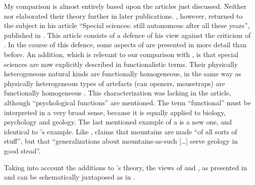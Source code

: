 \documentclass[output=paper]{langscibook}
\begin{document}
My comparison is almost entirely based upon the articles just discussed. Neither {\Sapir} nor {\Fodor} elaborated their theory further in later publications. {\Fodor}, however, returned to the subject in his article ``Special sciences: still autonomous after all these years'', published in \citeyear{Fodor1997}. This article consists of a defence of his view against the criticism of \citet{Kim1992}. In the course of this defence, some aspects of  are presented in more detail than before. An addition, which is relevant to our comparison with {\Sapir}, is that special sciences are now explicitly described in functionalistic terms. Their physically heterogeneous natural kinds are functionally homogeneous, in the same way as physically heterogeneous types of artefacts (can openers, mousetraps) are functionally homogeneous \citep[160]{Fodor1997}. This characterization was lacking in the \citeyear{Fodor1974} article, although ``psychological functions'' are mentioned. The term ``functional'' must be interpreted in a very broad sense, because it is equally applied to biology, psychology and geology. The last mentioned example of a  is a new one, and identical to {\Sapir}'s example. Like {\Sapir}, \citet[160]{Fodor1997} claims that mountains are made ``of all sorts of stuff'', but that ``generalizations about mountains-as-such […] serve geology in good stead''.

Taking into account the \citeyear{Fodor1997} additions to {\Fodor}'s theory, the views of {\Sapir} and {\Fodor}, as presented in  and  can be schematically juxtaposed as in .

\begin{table}
\caption{Comparison of the views of Sapir and Fodor}
\label{tab:elffers:sciences}
\end{table}
\end{document}
